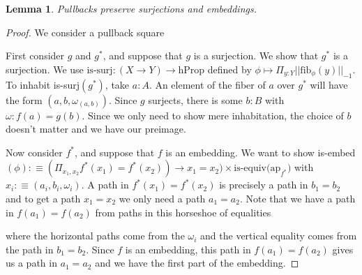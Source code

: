 \documentclass{article}
\newcommand{\0}{\mathbf{0}}
\newcommand{\1}{\mathbf{1}}
\newcommand{\defequiv}{: \equiv}
\newtheorem{lemma}{Lemma}
\begin{document}

\begin{lemma}\label{lemma: pullback}
Pullbacks preserve surjections and embeddings.
\end{lemma}
\begin{proof}
We consider a pullback square 

\begin{center}
\end{center}
First consider $g$ and $g^*$, and suppose that $g$ is a surjection. We show that $g^*$ is a surjection. We use $ \textrm{is-surj} : (X \to Y) \to \textrm{hProp}$ defined by $\phi \mapsto \Pi_{y : Y} || \textrm{fib}_\phi(y) ||_{-1}$. To inhabit is-surj$(g^*)$, take $a : A$. An element of the fiber of $a$ over $g^*$ will have the form $(a,b,\omega_{(a,b)})$. Since $g$ surjects, there is some $b : B$ with $\omega: f(a) = g(b)$. Since we only need to show mere inhabitation, the choice of $b$ doesn't matter and we have our preimage.

Now consider $f^*$, and suppose that $f$ is an embedding. We want to show is-embed$(\phi) \defequiv (\Pi_{x_1, x_2} f^*(x_1) = f^*(x_2)) \to x_1 = x_2) \times \textrm{is-equiv(ap}_{f^*})$ with $x_i \defequiv (a_i, b_i, \omega_i)$. A path in $f^*(x_1) = f^*(x_2)$ is precisely a path in $b_1 = b_2$ and to get a path $x_1 = x_2$ we only need a path $a_1 = a_2$. Note that we have a path in $f(a_1) = f(a_2)$ from paths in this horseshoe of equalities
\begin{center}
\end{center}
where the horizontal paths come from the $\omega_i$ and the vertical equality comes from the path in $b_1 = b_2$. Since $f$ is an embedding, this path in $f(a_1) = f(a_2)$ gives us a path in $a_1 = a_2$ and we have the first part of the embedding.


\end{proof}
\end{document}
